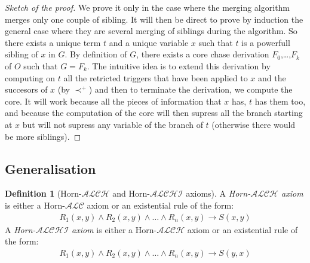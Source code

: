 \documentclass{article}
\theoremstyle{definition}
\newtheorem{definition}{Definition}[section]
\newtheorem{theorem}{Theorem}[section]
\theoremstyle{remark}
\begin{document}
\begin{proof}[Sketch of the proof]
We prove it only in the case where the merging algorithm merges only one couple of sibling. It will then be direct to prove by induction the general case where they are several merging of siblings during the algorithm.
So there exists a unique term $t$ and a unique variable $x$ such that $t$ is a powerfull sibling of $x$ in $G$. By definition of $G$, there exists a core chase derivation $F_0$,\ldots,$F_k$ of $O$ such that $G = F_k$. The intuitive idea is to extend this derivation by computing on $t$ all the retricted triggers that have been applied to $x$ and the succesors of $x$ (by $\prec^+$) and then to terminate the derivation, we compute the core. It will work because all the pieces of information that $x$ has, $t$ has them too, and because the computation of the core will then supress all the branch starting at $x$ but will not supress any variable of the branch of $t$ (otherwise there would be more siblings).
\end{proof} 

%

\subsection{Generalisation}

\begin{definition}[Horn-$\mathcal{ALCH}$ and Horn-$\mathcal{ALCHI}$ axioms]
A \emph{Horn-$\mathcal{ALCH}$ axiom} is either a Horn-$\mathcal{ALC}$ axiom or an existential rule of the form:
\begin{align}
R_1(x,y) \wedge R_2(x,y) \wedge \ldots \wedge R_n(x,y) \rightarrow S(x,y)
\end{align}
A \emph{Horn-$\mathcal{ALCHI}$ axiom} is either a Horn-$\mathcal{ALCH}$ axiom or an existential rule of the form:
\begin{align}
R_1(x,y) \wedge R_2(x,y) \wedge \ldots \wedge R_n(x,y) \rightarrow S(y,x)
\end{align}

\end{definition}
\end{document}
